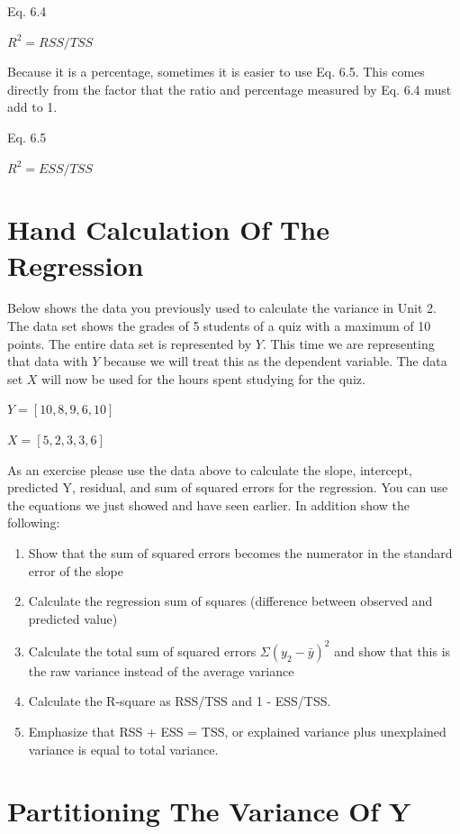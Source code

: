 \documentclass[]{book}
\providecommand{\tightlist}{%
  \setlength{\itemsep}{0pt}\setlength{\parskip}{0pt}}
\theoremstyle{definition}
\theoremstyle{definition}
\theoremstyle{definition}
\theoremstyle{remark}
\begin{document}
Eq. 6.4

\(R^2 = RSS/TSS\)

Because it is a percentage, sometimes it is easier to use Eq. 6.5. This
comes directly from the factor that the ratio and percentage measured by
Eq. 6.4 must add to 1.

Eq. 6.5

\(R^2 = ESS/TSS\)

\hypertarget{hand-calculation-of-the-regression}{%
\section{Hand Calculation Of The
Regression}\label{hand-calculation-of-the-regression}}

Below shows the data you previously used to calculate the variance in
Unit 2. The data set shows the grades of 5 students of a quiz with a
maximum of 10 points. The entire data set is represented by \(Y\). This
time we are representing that data with \(Y\) because we will treat this
as the dependent variable. The data set \(X\) will now be used for the
hours spent studying for the quiz.

\(Y = [10, 8, 9, 6, 10]\)

\(X = [5, 2, 3, 3, 6]\)

As an exercise please use the data above to calculate the slope,
intercept, predicted Y, residual, and sum of squared errors for the
regression. You can use the equations we just showed and have seen
earlier. In addition show the following:

\begin{enumerate}
\def\labelenumi{\arabic{enumi}.}
\tightlist
\item
  Show that the sum of squared errors becomes the numerator in the
  standard error of the slope
\item
  Calculate the regression sum of squares (difference between observed
  and predicted value)
\item
  Calculate the total sum of squared errors \(\Sigma(y_2 - \bar{y})^2\)
  and show that this is the raw variance instead of the average variance
\item
  Calculate the R-square as RSS/TSS and 1 - ESS/TSS.
\item
  Emphasize that RSS + ESS = TSS, or explained variance plus unexplained
  variance is equal to total variance.
\end{enumerate}

\hypertarget{partitioning-the-variance-of-y}{%
\section{Partitioning The Variance Of
Y}\label{partitioning-the-variance-of-y}}
\end{document}
